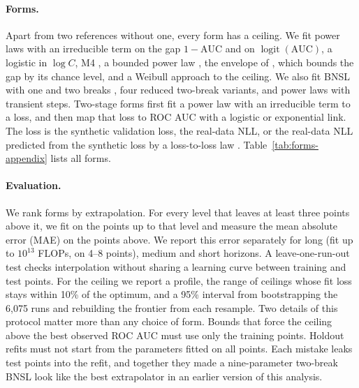 \paragraph{Forms.}
Apart from two references without one, every form has a ceiling. We fit power laws with an irreducible term on the gap $1-\text{AUC}$
\citep{hoffmann2022chinchilla} and on $\operatorname{logit}(\text{AUC})$, a logistic in $\log C$, M4
\citep{alabdulmohsin2022revisiting}, a bounded power law \citep{arora2025bayesian,viering2022shape}, the envelope of
\citet{rosenfeld2020constructive}, which bounds the gap by its chance level, and a Weibull approach to the ceiling. We
also fit BNSL with one and two breaks \citep{caballero2023bnsl}, four reduced two-break variants, and power laws with
transient steps. Two-stage forms first fit a power law with an irreducible term to a loss, and then map that loss to ROC
AUC with a logistic \citep{owen2024predictable,ruan2024observational} or exponential \citep{gadre2024overtraining} link.
The loss is the synthetic validation loss, the real-data NLL, or the real-data NLL predicted from the synthetic loss by
a loss-to-loss law \citep{brandfonbrener2024losstoloss}. Table~\ref{tab:forms-appendix} lists all forms.

\paragraph{Evaluation.}
We rank forms by extrapolation. For every level that leaves at least three points above it, we fit on the points up to
that level and measure the mean absolute error (MAE) on the points above. We report this error separately for long
(fit up to $10^{13}$ FLOPs, on 4--8 points), medium and short horizons. A leave-one-run-out test checks interpolation
without sharing a learning curve between training and test points. For the ceiling we report a profile, the range of
ceilings whose fit loss stays within 10\% of the optimum, and a 95\% interval from bootstrapping the 6{,}075 runs and
rebuilding the frontier from each resample. Two details of this protocol matter more than any choice of form. Bounds that
force the ceiling above the best observed ROC AUC must use only the training points. Holdout refits must not start from
the parameters fitted on all points. Each mistake leaks test points into the refit, and together they made a nine-parameter
two-break BNSL look like the best extrapolator in an earlier version of this analysis.

